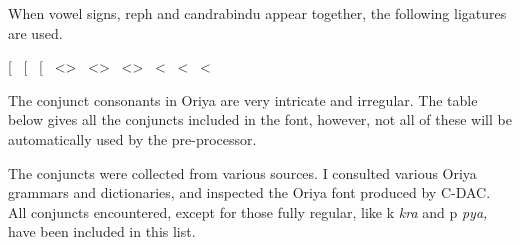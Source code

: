 \bigskip
{}
\medskip

When vowel signs, reph and candrabindu appear together, the following
ligatures are used.

\medskip

{\orXII
\dotcircle[\orcandrabindu\ %
\dotcircle[\orreph\ %
\dotcircle[\orreph\orcandrabindu\ %
<\dotcircle>\orcandrabindu\ %
<\dotcircle>\orreph\ %
<\dotcircle>\orreph\orcandrabindu\ %
<\dotcircle*\orcandrabindu\ %
<\dotcircle*\orreph\ %
<\dotcircle*\orreph\orcandrabindu\ %
}

\vfill\eject
{}
\bigskip

The conjunct consonants in Oriya are very intricate and irregular. The table
below gives all the conjuncts included in the font, however, not all of these
will be automatically used by the pre-processor.

The conjuncts were collected from various sources. I consulted various Oriya
grammars and dictionaries, and inspected the Oriya font produced by C-DAC. All 
conjuncts encountered, except for those fully regular, like {\or k\orsecra} {\it kra}
and {\or p\orsecya} {\it pya,} have been included in this list.

\medskip

\begindoublecolumns

